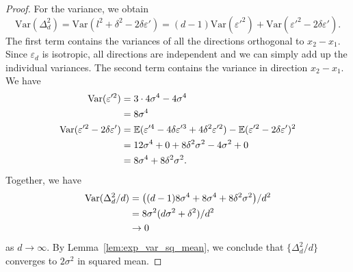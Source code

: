 \documentclass{article}
\theoremstyle{plain}
\theoremstyle{definition}
\theoremstyle{remark}
\begin{document}
\begin{proof}
    For the variance, we obtain
    $$\text{Var}(\Delta_d^2) = \text{Var}(l^2+\delta^2-2\delta \varepsilon') = (d-1)\text{Var}(\varepsilon'^2) + \text{Var}(\varepsilon'^2 - 2\delta \varepsilon').$$
    The first term contains the variances of all the directions orthogonal to $x_2-x_1$. Since $\varepsilon_d$ is isotropic, all directions are independent and we can simply add up the individual variances. The second term contains the variance in direction $x_2-x_1$. We have 
    \begin{align}
        \text{Var}(\varepsilon'^2)  &= 3\cdot 4\sigma^4 - 4\sigma^4 \notag\\
        &= 8\sigma^4\\
        \text{Var}(\varepsilon'^2 - 2\delta \varepsilon') &= \mathbb{E}(\varepsilon'^4 - 4\delta \varepsilon'^3 + 4\delta^2 \varepsilon'^2) - \mathbb{E}(\varepsilon'^2 - 2\delta \varepsilon')^2 \notag\\
        &= 12\sigma^4 +0+ 8\delta^2\sigma^2 - 4\sigma^2 +0\notag \\
        &= 8 \sigma^4+ 8\delta^2\sigma^2.
    \end{align}    
    Together, we have 
    \begin{align}
        \text{Var}(\Delta_d^2 / d) &= \big((d-1) 8\sigma^4 + 8\sigma^4 + 8\delta^2\sigma^2\big) / d^2 \notag \\
        &=8\sigma^2(d \sigma^2 +\delta^2) / d^2\notag \\
        &\to 0
    \end{align}
    as $d\to \infty$.
    By Lemma~\ref{lem:exp_var_sq_mean}, we conclude that $\{\Delta_d^2 / d\}$ converges to $2\sigma^2$ in squared mean.
\end{proof}
\end{document}
